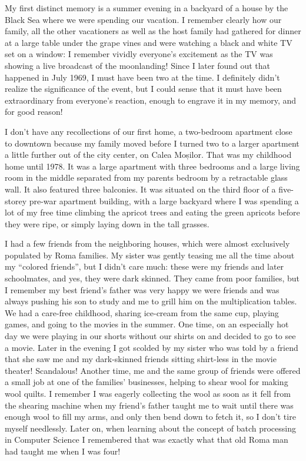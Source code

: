 \documentclass[12pt]{book}
\begin{document}
My first distinct memory is a summer evening in a backyard of a house by
the Black Sea where we were spending our vacation. I remember clearly
how our family, all the other vacationers as well as the host family had
gathered for dinner at a large table under the grape vines and were
watching a black and white TV set on a window: I remember vividly
everyone's excitement as the TV was showing a live broadcast of the
moonlanding! Since I later found out that happened in July 1969, I must
have been two at the time. I definitely didn't realize the significance
of the event, but I could sense that it must have been extraordinary
from everyone's reaction, enough to engrave it in my memory, and for
good reason!

I don't have any recollections of our first home, a two-bedroom
apartment close to downtown because my family moved before I turned two
to a larger apartment a little further out of the city center, on Calea
Moșilor. That was my childhood home until 1978. It was a large apartment
with three bedrooms and a large living room in the middle separated from
my parents bedroom by a retractable glass wall. It also featured three
balconies. It was situated on the third floor of a five-storey pre-war
apartment building, with a large backyard where I was spending a lot of
my free time climbing the apricot trees and eating the green apricots
before they were ripe, or simply laying down in the tall grasses.

I had a few friends from the neighboring houses, which were almost
exclusively populated by Roma families. My sister was gently teasing me
all the time about my ``colored friends'', but I didn't care much: these
were my friends and later schoolmates, and yes, they were dark skinned.
They came from poor families, but I remember my best friend's father was
very happy we were friends and was always pushing his son to study and
me to grill him on the multiplication tables. We had a care-free
childhood, sharing ice-cream from the same cup, playing games, and going
to the movies in the summer. One time, on an especially hot day we were
playing in our shorts without our shirts on and decided to go to see a
movie. Later in the evening I got scolded by my sister who was told by a
friend that she saw me and my dark-skinned friends sitting shirt-less in
the movie theater! Scandalous! Another time, me and the same group of
friends were offered a small job at one of the families' businesses,
helping to shear wool for making wool quilts. I remember I was eagerly
collecting the wool as soon as it fell from the shearing machine when my
friend's father taught me to wait until there was enough wool to fill my
arms, and only then bend down to fetch it, so I don't tire myself
needlessly. Later on, when learning about the concept of batch
processing in Computer Science I remembered that was exactly what that
old Roma man had taught me when I was four!
\end{document}

